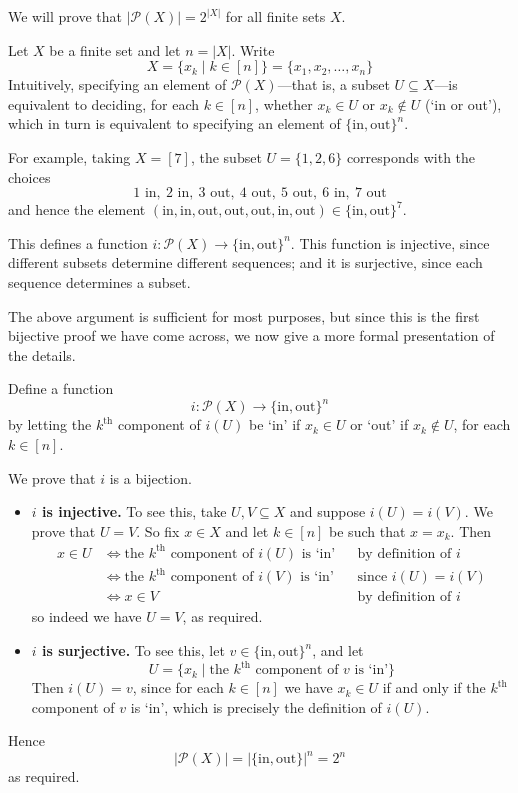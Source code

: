 \begin{example}
\label{exNumSubsetsOfFiniteSet}
We will prove that $|\mathcal{P}(X)| = 2^{|X|}$ for all finite sets $X$.

Let $X$ be a finite set and let $n=|X|$. Write
\[ X = \{ x_k \mid k \in [n] \} = \{ x_1, x_2, \dots, x_n \} \]
Intuitively, specifying an element of $\mathcal{P}(X)$---that is, a subset $U \subseteq X$---is equivalent to deciding, for each $k \in [n]$, whether $x_k \in U$ or $x_k \not \in U$ (`in or out'), which in turn is equivalent to specifying an element of $\{ \text{in}, \text{out} \}^n$.

For example, taking $X=[7]$, the subset $U = \{ 1, 2, 6 \}$ corresponds with the choices
\[ 1 \text{ in},\ 2 \text{ in},\ 3 \text{ out},\ 4 \text{ out},\ 5 \text{ out},\ 6 \text{ in},\ 7 \text{ out} \]
and hence the element $(\text{in}, \text{in}, \text{out}, \text{out}, \text{out}, \text{in}, \text{out}) \in \{ \text{in}, \text{out} \}^7$.

This defines a function $i : \mathcal{P}(X) \to \{ \text{in}, \text{out} \}^n$. This function is injective, since different subsets determine different sequences; and it is surjective, since each sequence determines a subset.

The above argument is sufficient for most purposes, but since this is the first bijective proof we have come across, we now give a more formal presentation of the details.

Define a function
\[ i : \mathcal{P}(X) \to \{ \text{in},\text{out} \}^n \]
by letting the $k^{\text{th}}$ component of $i(U)$ be `in' if $x_k \in U$ or `out' if $x_k \not \in U$, for each $k \in [n]$.

We prove that $i$ is a bijection.
\begin{itemize}
\item \textbf{$i$ is injective.} To see this, take $U,V \subseteq X$ and suppose $i(U) = i(V)$. We prove that $U=V$. So fix $x \in X$ and let $k \in [n]$ be such that $x=x_k$. Then
\begin{align*}
x \in U &\Leftrightarrow \text{the $k^{\text{th}}$ component of $i(U)$ is `in'} && \text{by definition of $i$} \\
&\Leftrightarrow \text{the $k^{\text{th}}$ component of $i(V)$ is `in'} && \text{since $i(U)=i(V)$} \\
&\Leftrightarrow x \in V && \text{by definition of $i$}
\end{align*}
so indeed we have $U=V$, as required.
\item \textbf{$i$ is surjective.} To see this, let $v \in \{ \text{in},\text{out} \}^n$, and let
\[ U = \{ x_k \mid \text{the } k^{\text{th}} \text{ component of } v \text{ is `in'} \} \]
Then $i(U)=v$, since for each $k \in [n]$ we have $x_k \in U$ if and only if the $k^{\text{th}}$ component of $v$ is `in', which is precisely the definition of $i(U)$.
\end{itemize}

Hence
\[ |\mathcal{P}(X)| = |\{\text{in},\text{out}\}|^n = 2^n \]
as required.
\end{example}

